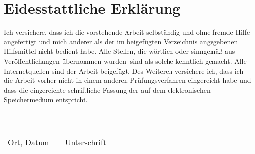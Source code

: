 \pagebreak

\section*{Eidesstattliche Erklärung}
Ich versichere, dass ich die vorstehende Arbeit selbständig und ohne fremde Hilfe angefertigt und mich anderer als der im beigefügten Verzeichnis angegebenen Hilfsmittel nicht bedient habe.
Alle Stellen, die wörtlich oder sinngemäß aus Veröffentlichungen übernommen wurden, sind als solche kenntlich gemacht. Alle Internetquellen sind der Arbeit beigefügt.
Des Weiteren versichere ich, dass ich die Arbeit vorher nicht in einem anderen Prüfungsverfahren eingereicht habe und dass die eingereichte schriftliche Fassung der auf dem elektronischen Speichermedium entspricht.
\\ \\ \\
\begin{tabular}{lp{3em}l}
 \hspace{5cm}   && \hspace{4cm} \\\cline{1-1}\cline{3-3}
 Ort, Datum     && Unterschrift
\end{tabular}

